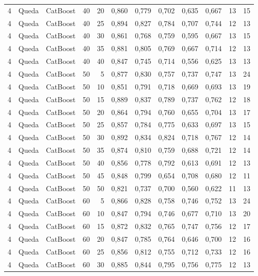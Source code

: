 \begin{longtable}{ccclrrrrrrrr}
4 & Queda & CatBoost & 40 & 20 & 0,860 & 0,779 & 0,702 & 0,635 & 0,667 & 13 & 15 \\
4 & Queda & CatBoost & 40 & 25 & 0,894 & 0,827 & 0,784 & 0,707 & 0,744 & 12 & 13 \\
4 & Queda & CatBoost & 40 & 30 & 0,861 & 0,768 & 0,759 & 0,595 & 0,667 & 13 & 15 \\
4 & Queda & CatBoost & 40 & 35 & 0,881 & 0,805 & 0,769 & 0,667 & 0,714 & 12 & 13 \\
4 & Queda & CatBoost & 40 & 40 & 0,847 & 0,745 & 0,714 & 0,556 & 0,625 & 13 & 13 \\
4 & Queda & CatBoost & 50 & 5 & 0,877 & 0,830 & 0,757 & 0,737 & 0,747 & 13 & 24 \\
4 & Queda & CatBoost & 50 & 10 & 0,851 & 0,791 & 0,718 & 0,669 & 0,693 & 13 & 19 \\
4 & Queda & CatBoost & 50 & 15 & 0,889 & 0,837 & 0,789 & 0,737 & 0,762 & 12 & 18 \\
4 & Queda & CatBoost & 50 & 20 & 0,864 & 0,794 & 0,760 & 0,655 & 0,704 & 13 & 17 \\
4 & Queda & CatBoost & 50 & 25 & 0,857 & 0,784 & 0,775 & 0,633 & 0,697 & 13 & 15 \\
4 & Queda & CatBoost & 50 & 30 & 0,892 & 0,834 & 0,824 & 0,718 & 0,767 & 12 & 14 \\
4 & Queda & CatBoost & 50 & 35 & 0,874 & 0,810 & 0,759 & 0,688 & 0,721 & 12 & 14 \\
4 & Queda & CatBoost & 50 & 40 & 0,856 & 0,778 & 0,792 & 0,613 & 0,691 & 12 & 13 \\
4 & Queda & CatBoost & 50 & 45 & 0,848 & 0,799 & 0,654 & 0,708 & 0,680 & 12 & 11 \\
4 & Queda & CatBoost & 50 & 50 & 0,821 & 0,737 & 0,700 & 0,560 & 0,622 & 11 & 13 \\
4 & Queda & CatBoost & 60 & 5 & 0,866 & 0,828 & 0,758 & 0,746 & 0,752 & 13 & 24 \\
4 & Queda & CatBoost & 60 & 10 & 0,847 & 0,794 & 0,746 & 0,677 & 0,710 & 13 & 20 \\
4 & Queda & CatBoost & 60 & 15 & 0,872 & 0,832 & 0,765 & 0,747 & 0,756 & 12 & 17 \\
4 & Queda & CatBoost & 60 & 20 & 0,847 & 0,785 & 0,764 & 0,646 & 0,700 & 12 & 16 \\
4 & Queda & CatBoost & 60 & 25 & 0,856 & 0,812 & 0,755 & 0,712 & 0,733 & 12 & 16 \\
4 & Queda & CatBoost & 60 & 30 & 0,885 & 0,844 & 0,795 & 0,756 & 0,775 & 12 & 13 \\

\end{longtable}
